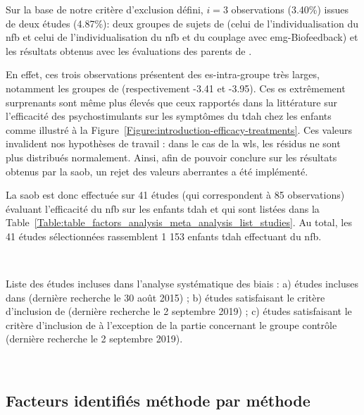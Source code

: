 Sur la base de notre critère d'exclusion défini, $i = 3$ observations (3.40\%) issues de deux études (4.87\%): deux groupes de sujets de 
\citet{Bazanova2018} (celui de l'individualisation du \gls{nfb} et 
celui de l'individualisation du \gls{nfb} et du couplage avec \gls{emg}-Biofeedback) et les résultats obtenus avec les évaluations des 
parents de \citet{Rajabi2019}. 

En effet, ces trois observations présentent des \gls{es}-intra-groupe très larges, notamment les groupes de \citet{Bazanova2018} 
(respectivement -3.41 et -3.95). Ces \gls{es} extrêmement surprenants sont même plus élevés que ceux rapportés dans la littérature sur l'efficacité 
des psychostimulants sur les symptômes du \gls{tdah} chez les enfants \citep{Luan2017} comme illustré à la Figure~\ref{Figure:introduction-efficacy-treatments}. 
Ces valeurs invalident nos hypothèses de travail : dans le cas de la 
\gls{wls}, les résidus ne sont plus distribués normalement. Ainsi, afin de pouvoir conclure sur les résultats obtenus par la \gls{saob}, 
un rejet des valeurs aberrantes a été implémenté.

La \gls{saob} est donc effectuée sur 41 études (qui correspondent à 85 observations) évaluant l'efficacité du \gls{nfb} sur les enfants \gls{tdah} et 
qui sont listées dans la Table~\ref{Table:table_factors_analysis_meta_analysis_list_studies}. Au total, les 41 études sélectionnées rassemblent 
1 153 enfants \gls{tdah} effectuant du \gls{nfb}.

\newpage\
\begin{table}[h!]
  \centering
  \caption{Liste des études incluses dans l'analyse systématique des biais : a) études incluses dans \citet{Cortese2016}
	(dernière recherche le 30 août 2015) ; b) études satisfaisant le critère d'inclusion de \citet{Cortese2016} (dernière recherche le 2 septembre 2019) ; c) études 
	satisfaisant le critère d'inclusion de \citet{Cortese2016} à l'exception de la partie concernant le groupe contrôle (dernière recherche le 2 septembre 2019).}
  
  \label{Table:table_factors_analysis_meta_analysis_list_studies}
\end{table}

\newpage\
\subsection{Facteurs identifiés méthode par méthode}

